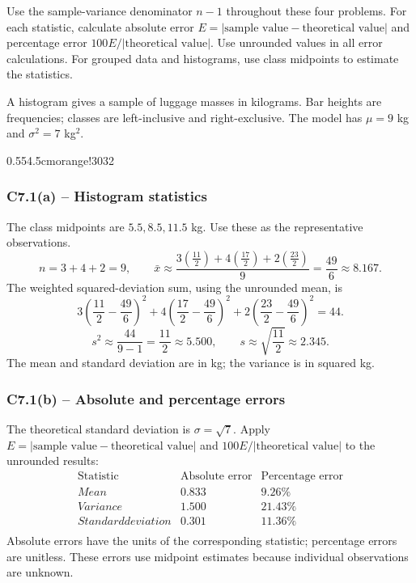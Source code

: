 Use the sample-variance denominator $n-1$ throughout these four problems.
For each statistic, calculate absolute error $E=|\text{sample value}-\text{theoretical value}|$
and percentage error $100E/|\text{theoretical value}|$. Use unrounded values in all error calculations.
For grouped data and histograms, use class midpoints to estimate the statistics.

{
A histogram gives a sample of luggage masses in kilograms. Bar heights are
frequencies; classes are left-inclusive and right-exclusive.
The model has $\mu=9$ kg and $\sigma^2=7$ kg$^2$.
\begin{center}
{0.55\textwidth}{4.5cm}{orange!30}{3}{2}
\end{center}
\label{sol:c7-1a}
\subsubsection*{C7.1(a) -- Histogram statistics }
The class midpoints are $5.5,8.5,11.5$ kg. Use these as the representative observations.
\[
n=3+4+2=9,\qquad
\bar{x}\approx\frac{3(\frac{11}{2})+4(\frac{17}{2})+2(\frac{23}{2})}{9}=\frac{49}{6}\approx8.167.
\]
The weighted squared-deviation sum, using the unrounded mean, is
\[
3\left(\frac{11}{2}-\frac{49}{6}\right)^2+4\left(\frac{17}{2}-\frac{49}{6}\right)^2+2\left(\frac{23}{2}-\frac{49}{6}\right)^2=44.
\]
\[
s^2\approx\frac{44}{9-1}=\frac{11}{2}\approx5.500,\qquad
s\approx\sqrt{\frac{11}{2}}\approx2.345.
\]
The mean and standard deviation are in kg; the variance is in squared kg.

\label{sol:c7-1b}
\subsubsection*{C7.1(b) -- Absolute and percentage errors }
The theoretical standard deviation is $\sigma=\sqrt{7}$.
Apply $E=|\text{sample value}-\text{theoretical value}|$ and
$100E/|\text{theoretical value}|$ to the unrounded results:
\[
\begin{array}{l|rr}
\text{Statistic}&\text{Absolute error}&\text{Percentage error}\\\hline
Mean&0.833&9.26\%\\
Variance&1.500&21.43\%\\
Standard deviation&0.301&11.36\%\\
\end{array}
\]
Absolute errors have the units of the corresponding statistic; percentage errors are unitless.
These errors use midpoint estimates because individual observations are unknown.
\secInicio[sec:c7-1]

}

